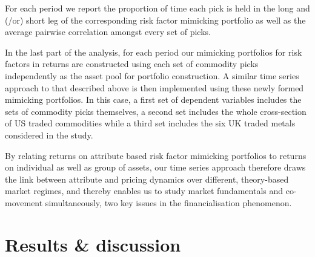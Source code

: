 \documentclass[]{elsarticle} %
\begin{document}
\medskip\setlength{\parindent}{0pt}

For each period we report the proportion of time each pick is held in the long and (/or) short leg of the corresponding risk factor mimicking portfolio as well as the average pairwise correlation amongst every set of picks.

\medskip\setlength{\parindent}{0pt}

In the last part of the analysis, for each period our mimicking portfolios for risk factors in returns are constructed using each set of commodity picks independently as the asset pool for portfolio construction. A similar time series approach to that described above is then implemented using these newly formed mimicking portfolios. In this case, a first set of dependent variables includes the sets of commodity picks themselves, a second set includes the whole cross-section of US traded commodities while a third set includes the six UK traded metals considered in the study.

\bigskip\bigskip\setlength{\parindent}{0pt}

By relating returns on attribute based risk factor mimicking portfolios to returns on individual as well as group of assets, our time series approach therefore draws the link between attribute and pricing dynamics over different, theory-based market regimes, and thereby enables us to study market fundamentals and co-movement simultaneously, two key issues in the financialisation phenomenon.

\newpage

\hypertarget{co-movement-results}{%
\section{Results \& discussion}\label{co-movement-results}}
\end{document}

